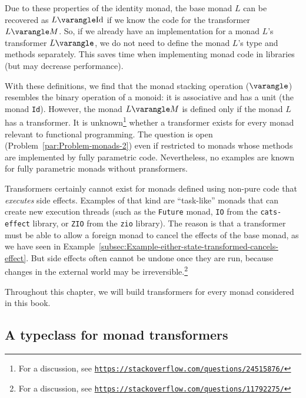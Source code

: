 Due to these properties of the identity monad, the base monad $L$
can be recovered as $L\varangle\text{Id}$ if we know the code for
the transformer $L\varangle M$. So, if we already have an implementation
for a monad $L$\textsf{'}s transformer $L\varangle$, we do not need to define
the monad $L$\textsf{'}s type and methods separately. This saves time when
implementing monad code in libraries (but may decrease performance).

With these definitions, we find that the monad stacking operation
($\varangle$) resembles the binary operation of a monoid: it is associative
and has a unit (the monad \lstinline!Id!). However, the monad $L\varangle M$
is defined only if the monad $L$ has a transformer. It is unknown\footnote{For a discussion, see \texttt{\href{https://stackoverflow.com/questions/24515876/}{https://stackoverflow.com/questions/24515876/}}}
whether a transformer exists for every monad relevant to functional
programming. The question is open (Problem~\ref{par:Problem-monads-2})
even if restricted to monads whose methods are implemented by fully
parametric code. Nevertheless, no examples are known for fully parametric
monads without pransformers.

Transformers certainly cannot exist for monads defined using non-pure
code that \emph{executes} side effects. Examples of that kind are
\textsf{``}task-like\textsf{''} monads that can create new execution threads (such
as the \lstinline!Future! monad, \lstinline!IO! from the \lstinline!cats-effect!
library, or \lstinline!ZIO! from the \lstinline!zio! library). The
reason is that a transformer must be able to allow a foreign monad
to cancel the effects of the base monad, as we have seen in Example~\ref{subsec:Example-either-state-transformed-cancels-effect}.
But side effects often cannot be undone once they are run, because
changes in the external world may be irreversible.\footnote{For a discussion, see \texttt{\href{https://stackoverflow.com/questions/11792275/}{https://stackoverflow.com/questions/11792275/}}} 

Throughout this chapter, we will build transformers for every monad
considered in this book.

\subsection{A typeclass for monad transformers}

